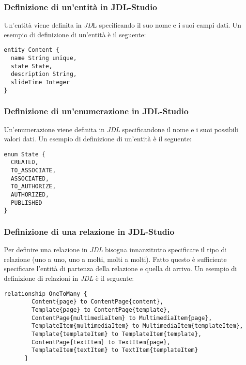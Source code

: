 \subsubsection{Definizione di un'entità in JDL-Studio}
Un'entità viene definita in \textit{JD}L specificando il suo nome e i suoi campi dati. Un esempio di definizione di un'entità è il seguente:
\begin{lstlisting}[caption={Definizione entità Content},label={lst:ent}]
entity Content {
  name String unique,
  state State,
  description String,
  slideTime Integer
}
\end{lstlisting}
\subsubsection{Definizione di un'enumerazione in JDL-Studio}
Un'enumerazione viene definita in \textit{JDL} specificandone il nome e i suoi possibili valori dati. Un esempio di definizione di un'entità è il seguente:
\begin{lstlisting}[caption={Definizione enumerazione State},label={lst:en}]
enum State {
  CREATED,
  TO_ASSOCIATE,
  ASSOCIATED,
  TO_AUTHORIZE,
  AUTHORIZED,
  PUBLISHED
}
\end{lstlisting}
\subsubsection{Definizione di una relazione in JDL-Studio}
Per definire una relazione in \textit{JDL} bisogna innanzitutto specificare il tipo di relazione (uno a uno, uno a molti, molti a molti). Fatto questo è sufficiente specificare l'entità di partenza della relazione e quella di arrivo. Un esempio di definizione di relazioni in \textit{JDL} è il seguente:
\begin{lstlisting}[caption={Definizione relazioni uno a molti},label={lst:rel}]
    relationship OneToMany {
        Content{page} to ContentPage{content},
        Template{page} to ContentPage{template},
        ContentPage{multimediaItem} to MultimediaItem{page},
        TemplateItem{multimediaItem} to MultimediaItem{templateItem},
        Template{templateItem} to TemplateItem{template},
        ContentPage{textItem} to TextItem{page},
        TemplateItem{textItem} to TextItem{templateItem}
      }
\end{lstlisting}
\newpage
